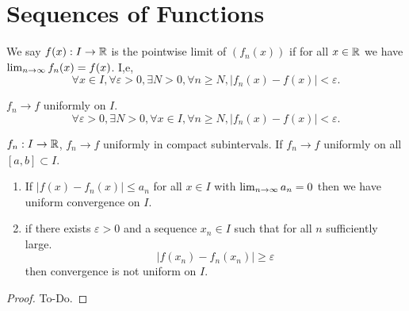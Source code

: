 \chapter{Sequences of Functions}\label{cha:seqoffuncs}

\begin{definition}\label{def:pointwise_limit}
    We say $f(x) : I \to \mathbb{R}$ is the pointwise limit of $(f_n(x))$ if for all $x \in \mathbb{R}$ we have $\lim_{n \rightarrow \infty} f_n(x) = f(x)$.
    I,e,
    \[
    \forall x \in I, \forall \varepsilon > 0, \exists N > 0, \forall n \geq N, |f_n(x) - f(x)| < \varepsilon.
    \]
\end{definition}

\begin{definition}\label{def:uni_conv}
    $f_n \to f$ uniformly on $I$.
    \[
    \forall \varepsilon > 0, \exists N > 0, \forall x \in I, \forall n \geq N, |f_n(x) - f(x)| < \varepsilon.
    \]
\end{definition}

\begin{definition}\label{def:uni_conv_on_compact_subsets}
    $f_n : I \to \mathbb{R}$,
    $f_n \to f$ uniformly in compact subintervals.
    If $f_n \to f$ uniformly on all $[a, b] \subset I$.
\end{definition}

\begin{lemma}[Criterion]\label{lem:seq_funcs_criterion}
    \begin{enumerate}[label = (\roman*)]
        \item If $|f(x) - f_n(x)| \leq a_n$ for all $x \in I$ with $\lim_{n \rightarrow \infty} a_n = 0$ then we have uniform convergence on $I$.

        \item if there exists $\varepsilon > 0$ and a sequence $x_n \in I$ such that for all $n$ sufficiently large.
        \[
        |f(x_n) - f_n(x_n)| \geq \varepsilon
        \]
        then convergence is not uniform on $I$.
    \end{enumerate}
\end{lemma}
\begin{proof}
    To-Do.
\end{proof}

